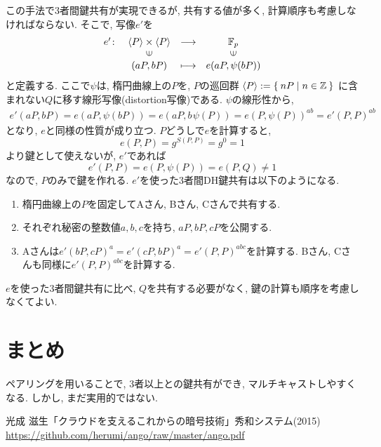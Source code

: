 \documentclass[a4paper,11pt]{jsarticle}
\begin{document}
この手法で3者間鍵共有が実現できるが, 共有する値が多く, 
計算順序も考慮しなければならない.
そこで, 写像$e'$を
\[
  \begin{array}{rccc}
    e' \colon & \left<P\right> \times \left<P\right> & \longrightarrow & \mathbb{F}_p \\
      & \rotatebox{90}{$\in$} & & \rotatebox{90}{$\in$} \\
      & (aP, bP) & \longmapsto & e(aP, \psi(bP))
  \end{array}
\]
と定義する.
ここで$\psi$は, 楕円曲線上の$P$を, $P$の巡回群
$\left<P\right> := \Set{nP | n \in \mathbb{Z}}$
に含まれない$Q$に移す線形写像(distortion写像)である\cite{bib1}.
$\psi$の線形性から,
\begin{eqnarray*}
  e'(aP, bP) = e(aP, \psi(bP)) = e(aP, b\hspace{1pt}\psi(P)) = e(P, \psi(P))^{ab} = e'(P, P)^{ab}
\end{eqnarray*}
となり, $e$と同様の性質が成り立つ.
$P$どうしで$e$を計算すると, 
\[
  e(P, P) = g^{S(P, P)} = g^0 = 1
\]
より鍵として使えないが, $e'$であれば
\[
  e'(P, P) = e(P, \psi(P)) = e(P, Q) \neq 1
\]
なので, $P$のみで鍵を作れる.
$e'$を使った3者間DH鍵共有は以下のようになる.
\begin{enumerate}
  \item 楕円曲線上の$P$を固定してAさん, Bさん, Cさんで共有する.
  \item それぞれ秘密の整数値$a, b, c$を持ち, $aP, bP, cP$を公開する.
  \item Aさんは$e'(bP, cP)^a = e'(cP, bP)^a = e'(P, P)^{abc}$を計算する.
    Bさん, Cさんも同様に$e'(P, P)^{abc}$を計算する.
\end{enumerate}
$e$を使った3者間鍵共有に比べ, $Q$を共有する必要がなく, 
鍵の計算も順序を考慮しなくてよい.

\section{まとめ}
ペアリングを用いることで, 3者以上との鍵共有ができ,
マルチキャストしやすくなる.
しかし, まだ実用的ではない.

\begin{thebibliography}{99}
  光成 滋生「クラウドを支えるこれからの暗号技術」秀和システム(2015) \url{https://github.com/herumi/ango/raw/master/ango.pdf}
\end{thebibliography}
\end{document}
